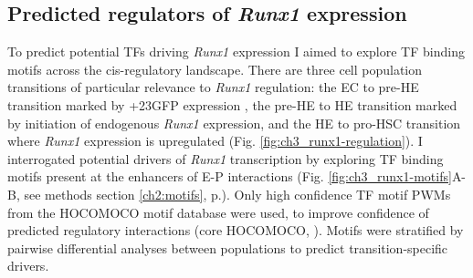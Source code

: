 \subsection{\label{ch3:runx1-motifs}Predicted regulators of \textit{Runx1} expression}

To predict potential TFs driving \textit{Runx1} expression I aimed to explore TF binding motifs across the cis-regulatory landscape. There are three cell population transitions of particular relevance to \textit{Runx1} regulation: the EC to pre-HE transition marked by +23GFP expression \citep{swiers_early_2013}, the pre-HE to HE transition marked by initiation of endogenous \textit{Runx1} expression, and the HE to pro-HSC transition where \textit{Runx1} expression is upregulated (Fig. \ref{fig:ch3_runx1-regulation}). I interrogated potential drivers of \textit{Runx1} transcription by exploring TF binding motifs present at the enhancers of E-P interactions (Fig. \ref{fig:ch3_runx1-motifs}A-B, see methods section \ref{ch2:motifs}, p.\pageref{ch2:motifs}). Only high confidence TF motif PWMs from the HOCOMOCO motif database were used, to improve confidence of predicted regulatory interactions (core HOCOMOCO, \cite{kulakovskiy_hocomoco_2018}). Motifs were stratified by pairwise differential analyses between populations to predict transition-specific drivers. 

